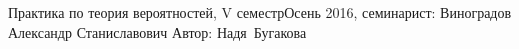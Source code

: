 


\BigHeader
    {Практика по теория вероятностей, V семестр}{Осень 2016, семинарист: Виноградов Александр Станиславович}
    {Автор: Надя~Бугакова}
\gdef\LectureName{Теор. вер-тей, V семестр}

%

